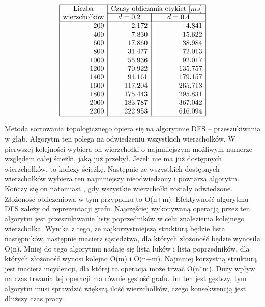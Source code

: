 \documentclass[polish,polish,a4paper]{article}
\begin{document}
\begin{spacing}{1.25}
	
\begin{spacing}{1.5}
	\begin{equation*}
\begin{array}{|r|r|r|}
\hline
\multicolumn{1}{|c|}{$Liczba$}&\multicolumn{2}{c|}{$Czasy obliczania etykiet $[ms]}\\\cline{2-3}
\multicolumn{1}{|c|}{$wierzchołków$}&\multicolumn{1}{c|}{\quad d=0.2\quad}&\multicolumn{1}{|c|}{d=0.4}\\
\hline
200&2.172&4.841\\
400&7.830&15.622\\
600&17.860&38.984\\
800&31.477&72.013\\
1000&55.936&92.017\\
1200&70.922&135.757\\
1400&91.161&179.157\\
1600&117.204&265.713\\
1800&175.443&295.831\\
2000&183.787&367.042\\
2200&222.953&616.094\\
\hline
\end{array}
\end{equation*}
\end{spacing}
	
		
Metoda sortowania topologicznego opiera się na algorytmie DFS – przeszukiwania w głąb. Algorytm ten polega na odwiedzeniu wszystkich wierzchołków. W pierwszej kolejności wybiera on wierzchołki o najmniejszym możliwym numerze względem całej ścieżki, jaką już przebył. Jeżeli nie ma już dostępnych wierzchołków, to kończy ścieżkę. Następnie ze wszystkich dostępnych wierzchołków wybiera ten najmniejszy nieodwiedzony i powtarza algorytm. Kończy się on natomiast , gdy wszystkie wierzchołki zostały odwiedzone. Złożoność obliczeniowa w tym przypadku to O(n+m). Efektywność algorytmu DFS zależy od reprezentacji grafu. Najczęściej wykonywaną operacją przez ten algorytm jest przeszukiwanie listy poprzedników w celu znalezienia kolejnego wierzchołka. Wynika z tego, że najkorzystniejszą strukturą będzie lista następników, następnie macierz sąsiedztwa, dla których złożoność będzie wynosiła O(n). Mniej do tego algorytmu nadaje się lista łuków i lista poprzedników, dla których złożoność wynosi kolejno O(m) i O(n+m). Najmniej korzystną strukturą jest macierz incydencji, dla której ta operacja może trwać O(n*m). Duży wpływ na czas trwania tej operacji ma równie gęstość grafu. Im ten jest gęstszy, tym algorytm musi sprawdzić większą ilość wierzchołków, czego konsekwencją jest dłuższy czas pracy.
	

\end{spacing}
\end{document}
